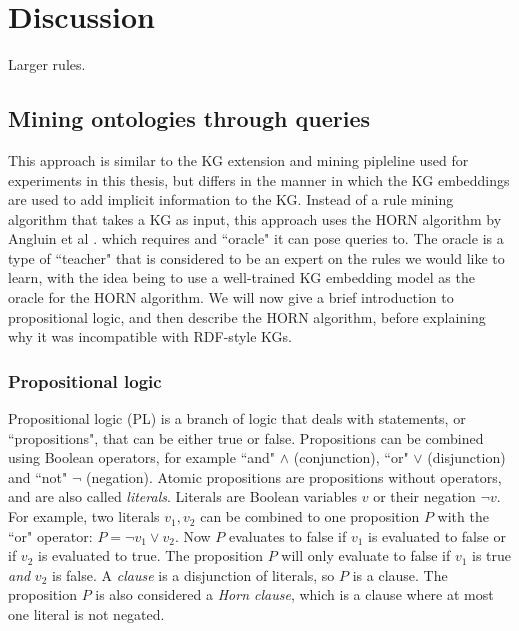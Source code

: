 \chapter{Discussion}




Larger rules.


\section{Mining ontologies through queries}
This approach is similar to the KG extension and mining pipleline used for experiments in this thesis, but differs in the manner in which the KG embeddings are used to add implicit information to the KG. Instead of a rule mining algorithm that takes a KG as input, this approach uses the HORN algorithm by Angluin et al \cite{DBLP:journals/ml/AngluinFP92}. which requires and ``oracle" it can pose queries to. The oracle is a type of ``teacher" that is considered to be an expert on the rules we would like to learn, with the idea being to use a well-trained KG embedding model as the oracle for the HORN algorithm. We will now give a brief introduction to propositional logic, and then describe the HORN algorithm, before explaining why it was incompatible with RDF-style KGs.

\subsection{Propositional logic}

Propositional logic (PL) is a branch of logic that deals with statements, or ``propositions", that can be either true or false. Propositions can be combined using Boolean operators, for example ``and" $\wedge$ (conjunction), ``or" $\vee$ (disjunction) and ``not" $\neg$ (negation). Atomic propositions are propositions without operators, and are also called \textit{literals}. Literals are Boolean variables $v$ or their negation $\neg v$. For example, two literals $v_1, v_2$ can be combined to one proposition $P$ with the ``or" operator: $P = \neg v_1 \vee v_2$. Now $P$ evaluates to false if $v_1$ is evaluated to false or if $v_2$ is evaluated to true. The proposition $P$ will only evaluate to false if $v_1$ is true \textit{and} $v_2$ is false. A \textit{clause} is a disjunction of literals, so $P$ is a clause. The proposition $P$ is also considered a \textit{Horn clause}, which is a clause where at most one literal is not negated. 


